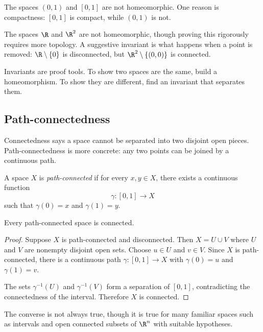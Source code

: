 \begin{example}
The spaces $(0,1)$ and $[0,1]$ are not homeomorphic. One reason is compactness:
$[0,1]$ is compact, while $(0,1)$ is not.
\end{example}

\begin{example}
The spaces $\R$ and $\R^2$ are not homeomorphic, though proving this rigorously
requires more topology. A suggestive invariant is what happens when a point is
removed: $\R\setminus\{0\}$ is disconnected, but $\R^2\setminus\{(0,0)\}$ is
connected.
\end{example}

Invariants are proof tools. To show two spaces are the same, build a
homeomorphism. To show they are different, find an invariant that separates
them.

\subsection{Path-connectedness}

Connectedness says a space cannot be separated into two disjoint open pieces.
Path-connectedness is more concrete: any two points can be joined by a
continuous path.

\begin{definition}
A space $X$ is \emph{path-connected} if for every $x,y\in X$, there exists a
continuous function
\[
\gamma:[0,1]\to X
\]
such that $\gamma(0)=x$ and $\gamma(1)=y$.
\end{definition}

\begin{theorem}
Every path-connected space is connected.
\end{theorem}

\begin{proof}
Suppose $X$ is path-connected and disconnected. Then $X=U\cup V$ where $U$ and
$V$ are nonempty disjoint open sets. Choose $u\in U$ and $v\in V$. Since $X$ is
path-connected, there is a continuous path $\gamma:[0,1]\to X$ with
$\gamma(0)=u$ and $\gamma(1)=v$.

The sets $\gamma^{-1}(U)$ and $\gamma^{-1}(V)$ form a separation of $[0,1]$,
contradicting the connectedness of the interval. Therefore $X$ is connected.
\end{proof}

The converse is not always true, though it is true for many familiar spaces such
as intervals and open connected subsets of $\R^n$ with suitable hypotheses.

